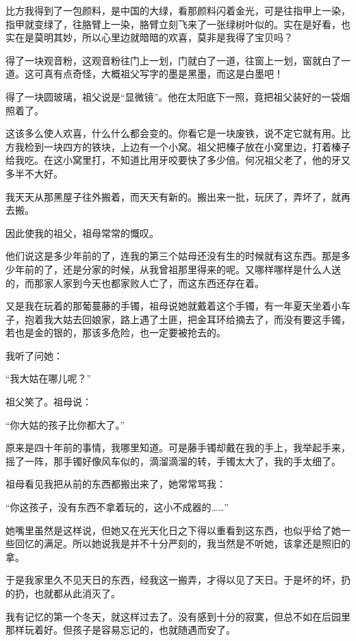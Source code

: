 \par 比方我得到了一包颜料，是中国的大绿，看那颜料闪着金光，可是往指甲上一染，指甲就变绿了，往胳臂上一染，胳臂立刻飞来了一张绿树叶似的。实在是好看，也实在是莫明其妙，所以心里边就暗暗的欢喜，莫非是我得了宝贝吗？
\par 得了一块观音粉，这观音粉往门上一划，门就白了一道，往窗上一划，窗就白了一道。这可真有点奇怪，大概祖父写字的墨是黑墨，而这是白墨吧！
\par 得了一块圆玻璃，祖父说是“显微镜”。他在太阳底下一照，竟把祖父装好的一袋烟照着了。
\par 这该多么使人欢喜，什么什么都会变的。你看它是一块废铁，说不定它就有用。比方我检到一块四方的铁块，上边有一个小窝。祖父把榛子放在小窝里边，打着榛子给我吃。在这小窝里打，不知道比用牙咬要快了多少倍。何况祖父老了，他的牙又多半不大好。
\par 我天天从那黑屋子往外搬着，而天天有新的。搬出来一批，玩厌了，弄坏了，就再去搬。
\par 因此使我的祖父，祖母常常的慨叹。
\par 他们说这是多少年前的了，连我的第三个姑母还没有生的时候就有这东西。那是多少年前的了，还是分家的时候，从我曾祖那里得来的呢。又哪样哪样是什么人送的，而那家人家到今天也都家败人亡了，而这东西还存在着。
\par 又是我在玩着的那葡蔓藤的手镯，祖母说她就戴着这个手镯，有一年夏天坐着小车子，抱着我大姑去回娘家，路上遇了土匪，把金耳环给摘去了，而没有要这手镯，若也是金的银的，那该多危险，也一定要被抢去的。
\par 我听了问她：
\par “我大姑在哪儿呢？”
\par 祖父笑了。祖母说：
\par “你大姑的孩子比你都大了。”
\par 原来是四十年前的事情，我哪里知道。可是藤手镯却戴在我的手上，我举起手来，摇了一阵，那手镯好像风车似的，滴溜滴溜的转，手镯太大了，我的手太细了。
\par 祖母看见我把从前的东西都搬出来了，她常常骂我：
\par “你这孩子，没有东西不拿着玩的，这小不成器的……”
\par 她嘴里虽然是这样说，但她又在光天化日之下得以重看到这东西，也似乎给了她一些回忆的满足。所以她说我是并不十分严刻的，我当然是不听她，该拿还是照旧的拿。
\par 于是我家里久不见天日的东西，经我这一搬弄，才得以见了天日。于是坏的坏，扔的扔，也就都从此消灭了。
\par 我有记忆的第一个冬天，就这样过去了。没有感到十分的寂寞，但总不如在后园里那样玩着好。但孩子是容易忘记的，也就随遇而安了。
